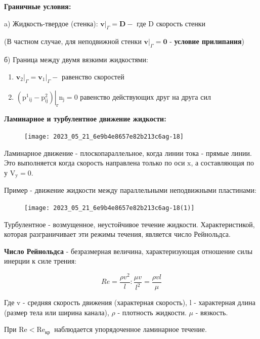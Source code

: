 \textbf{Граничные условия:}


a) Жидкость-твердое (стенка):
$\left.\mathbf{v}\right|_{\Gamma}=\mathbf{D}-$ где $\mathrm{D}$ скорость стенки

(В частном случае, для неподвижной стенки $\left.\mathbf{v}\right|_{\Gamma}=\mathbf{0}$ - \textbf{условие прилипания})

б) Граница между двумя вязкими жидкостями:

\begin{enumerate}
  \item $\left.\mathbf{v}_2\right|_{\Gamma}=\left.\mathbf{v}_1\right|_{\Gamma}-$ равенство скоростей

  \item $\left.\left(\mathrm{p}^{1}{ }_{\mathrm{ij}}-\mathrm{p}^{2} _\mathrm{ij}\right)\right|_{г} \mathrm{n}_{\mathrm{j}}=0$ равенство действующих друг на друга сил

\end{enumerate}

\textbf{Ламинарное и турбулентное движение жидкости:}

\begin{figure}[h!]
    \centering
    \texttt{[image: 2023\_05\_21\_6e9b4e8657e82b213c6ag-18]}
\end{figure}


Ламинарное движение - плоскопараллельное, когда линии тока - прямые линии. Это выполняется когда скорость направлена только по оси $\mathrm{x}$, а составляющая по у $\mathrm{V}_{\mathrm{y}}=0$.

Пример - движение жидкости между параллельными неподвижными пластинами:
\begin{figure}[h!]
    \centering
    \texttt{[image: 2023\_05\_21\_6e9b4e8657e82b213c6ag-18(1)]}
\end{figure}

Турбулентное - возмущенное, неустойчивое течение жидкости. Характеристикой, которая разграничивает эти режимы течения, является число Рейнольдса.

\textbf{Число Рейнольдса} - безразмерная величина, характеризующая отношение силы инерции к силе трения:

$$
R e=\frac{\rho v^{2}}{l}: \frac{\mu v}{l^{2}}=\frac{\rho v l}{\mu}
$$

Где v - средняя скорость движения (характерная скорость), l - характерная длина (размер тела или ширина канала), $\rho$ - плотность жидкости. $\mu$ - вязкость.

При $\mathrm{Re}<\mathrm{Re}_{\text {кр }}$ наблюдается упорядоченное ламинарное течение.

